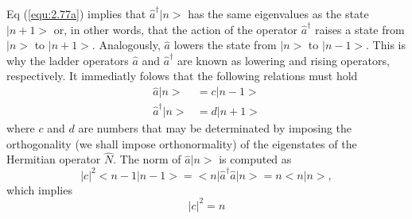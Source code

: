 Eq (\ref{equ:2.77a}) implies that $\hat{a}^{\dagger}|n>$ has
the same eigenvalues as the state $|n+1>$ or, in other
words, that the action of the operator $\hat{a}^{\dagger}$
raises a state from $|n>$ to $|n+1>$. Analogously, $\hat{a}$
lowers the state from $|n>$ to $|n-1>$. This is why the
ladder operators $\hat{a}$ and $\hat{a}^{\dagger}$ are known
as lowering and rising operators, respectively.
It immediatly folows that the following relations must hold
\begin{align}
  \hat{a}|n> &= c |n-1> \nonumber\\
  \hat{a}^{\dagger}|n> &= d |n+1> \label{equ:2.78}
\end{align}
where $c$ and $d$ are numbers that may be determinated by
imposing the orthogonality (we shall impose orthonormality)
of the eigenstates of the Hermitian operator $\hat{N}$. The
norm of $\hat{a}|n>$ is computed as
$$
|c|^2 <n-1|n-1> = <n|\hat{a}^{\dagger}\hat{a}|n> = n<n|n>,
$$
which implies
\begin{equation}
  |c|^2 = n
  \label{equ:2.79}
\end{equation}
